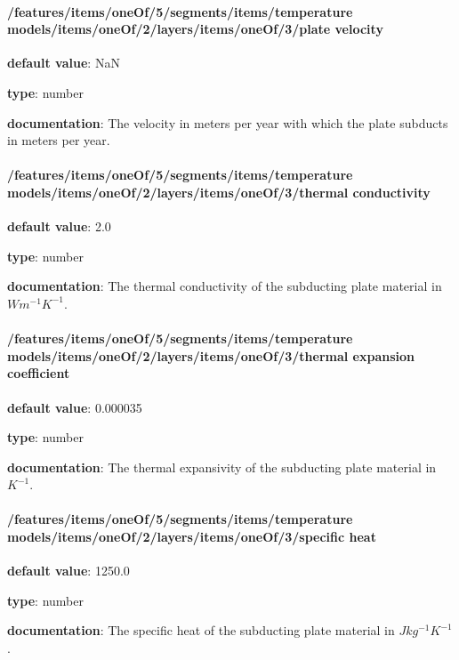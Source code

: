 \begin{itemized}
\end{itemized}\paragraph{/features/items/oneOf/5/segments/items/temperature models/items/oneOf/2/layers/items/oneOf/3/plate velocity} \begin{itemized}
\item {\bf default value}: NaN
\item {\bf type}: number
\item {\bf documentation}: The velocity in meters per year with which the plate subducts in meters per year.
\end{itemized}\paragraph{/features/items/oneOf/5/segments/items/temperature models/items/oneOf/2/layers/items/oneOf/3/thermal conductivity} \begin{itemized}
\item {\bf default value}: 2.0
\item {\bf type}: number
\item {\bf documentation}: The thermal conductivity of the subducting plate material in $W m^{-1} K^{-1}$.
\end{itemized}\paragraph{/features/items/oneOf/5/segments/items/temperature models/items/oneOf/2/layers/items/oneOf/3/thermal expansion coefficient} \begin{itemized}
\item {\bf default value}: 0.000035
\item {\bf type}: number
\item {\bf documentation}: The thermal expansivity of the subducting plate material in $K^{-1}$.
\end{itemized}\paragraph{/features/items/oneOf/5/segments/items/temperature models/items/oneOf/2/layers/items/oneOf/3/specific heat} \begin{itemized}
\item {\bf default value}: 1250.0
\item {\bf type}: number
\item {\bf documentation}: The specific heat of the subducting plate material in $J kg^{-1} K^{-1}$.

\end{itemized}
